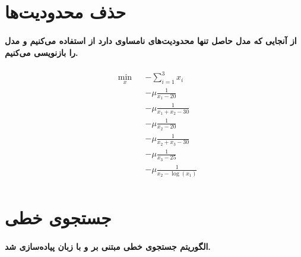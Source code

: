 \documentclass[paper=a4, fontsize=11pt]{article}
\numberwithin{equation}{section} %
\numberwithin{figure}{section} %
\numberwithin{table}{section} %
\begin{document}
\section{حذف محدودیت‌ها}

\paragraph{
    از آنجایی که مدل حاصل تنها محدودیت‌های نامساوی دارد از  استفاده می‌کنیم و مدل را بازنویسی می‌کنیم.
}

\begin{equation}
	\begin{aligned}
		& \underset{x}{\text{min}}
		& & -\sum_{i=1}^{3} x_i \\
		& & & - \mu\frac{1}{x_1 - 20} \\
		& & & - \mu\frac{1}{x_1 + x_2 - 30} \\
		& & & - \mu\frac{1}{x_2 - 20} \\
		& & & - \mu\frac{1}{x_2 + x_3 - 30} \\
		& & & - \mu\frac{1}{x_3 - 25} \\
		& & & - \mu\frac{1}{x_2 - \log(x_1)} \\
	\end{aligned}					
\end{equation}

\section{جستجوی خطی}
\paragraph{
    الگوریتم جستجوی خطی مبتنی بر  و  با زبان 
    پیاده‌سازی شد.
}
\end{document}
